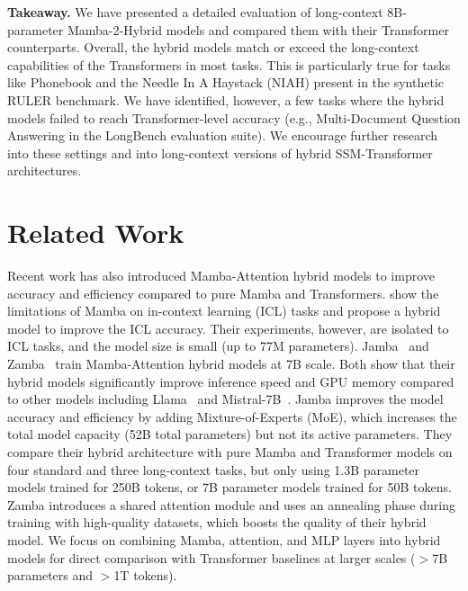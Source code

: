 \textbf{Takeaway.}
We have presented a detailed evaluation of long-context 8B-parameter Mamba-2-Hybrid models and compared them with their Transformer counterparts. Overall, the hybrid models match or exceed the long-context capabilities of the Transformers in most tasks. This is particularly true for tasks like Phonebook and the Needle In A Haystack (NIAH) present in the synthetic RULER benchmark. We have identified, however, a few tasks where the hybrid models failed to reach Transformer-level accuracy (e.g., Multi-Document Question Answering in the LongBench evaluation suite). We encourage further research into these settings and into long-context versions of hybrid SSM-Transformer architectures.

\section{Related Work} Recent work has also introduced Mamba-Attention hybrid models to improve accuracy and efficiency compared to pure Mamba and Transformers. \citep{park2024can} show the limitations of Mamba on in-context learning (ICL) tasks and propose a hybrid model to improve the ICL accuracy. Their experiments, however, are isolated to ICL tasks, and the model size is small (up to 77M parameters). Jamba~\citep{lieber2024jamba} and Zamba~\citep{glorioso2024zamba} train Mamba-Attention hybrid models at 7B scale. Both show that their hybrid models significantly improve inference speed and GPU memory compared to other models including Llama~\citep{touvron2023llama} and Mistral-7B~\citep{jiang2023mistral}. Jamba improves the model accuracy and efficiency by adding Mixture-of-Experts (MoE), which increases the total model capacity (52B total parameters) but not its active parameters. They compare their hybrid architecture with pure Mamba and Transformer models on four standard and three long-context tasks, but only using 1.3B parameter models trained for 250B tokens, or 7B parameter models trained for 50B tokens. Zamba introduces a shared attention module and uses an annealing phase during training with high-quality datasets, which boosts the quality of their hybrid model. We focus on combining Mamba, attention, and MLP layers into hybrid models for direct comparison with Transformer baselines at larger scales ($>$7B parameters and $>$1T tokens). 

